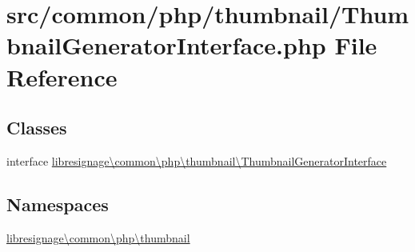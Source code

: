 \hypertarget{ThumbnailGeneratorInterface_8php}{}\section{src/common/php/thumbnail/\+Thumbnail\+Generator\+Interface.php File Reference}
\label{ThumbnailGeneratorInterface_8php}
\subsection*{Classes}
\begin{DoxyCompactItemize}
\item 
interface \hyperlink{interfacelibresignage_1_1common_1_1php_1_1thumbnail_1_1ThumbnailGeneratorInterface}{libresignage\textbackslash{}common\textbackslash{}php\textbackslash{}thumbnail\textbackslash{}\+Thumbnail\+Generator\+Interface}
\end{DoxyCompactItemize}
\subsection*{Namespaces}
\begin{DoxyCompactItemize}
\item 
 \hyperlink{namespacelibresignage_1_1common_1_1php_1_1thumbnail}{libresignage\textbackslash{}common\textbackslash{}php\textbackslash{}thumbnail}
\end{DoxyCompactItemize}
